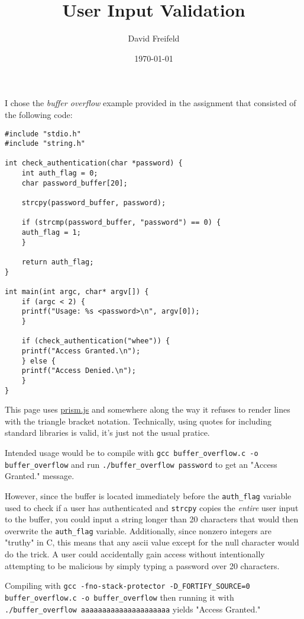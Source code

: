 \documentclass[11pt]{article}
\author{David Freifeld}
\date{\today}
\title{User Input Validation}
\begin{document}
\maketitle
I chose the \emph{buffer overflow} example provided in the assignment that consisted of the following code:

\begin{verbatim}
#include "stdio.h"
#include "string.h"

int check_authentication(char *password) {
    int auth_flag = 0;
    char password_buffer[20];

    strcpy(password_buffer, password);

    if (strcmp(password_buffer, "password") == 0) {
	auth_flag = 1;
    }

    return auth_flag;
}

int main(int argc, char* argv[]) {
    if (argc < 2) {
	printf("Usage: %s <password>\n", argv[0]);
    }

    if (check_authentication("whee")) {
	printf("Access Granted.\n");
    } else {
	printf("Access Denied.\n");
    }
}
\end{verbatim}

\begin{note}
This page uses \href{https://prismjs.com}{prism.js} and somewhere along the way it refuses to render lines with the triangle bracket notation. Technically, using quotes for including standard libraries is valid, it's just not the usual pratice.
\end{note}

Intended usage would be to compile with \texttt{gcc buffer\_overflow.c -o buffer\_overflow} and run \texttt{./buffer\_overflow password} to get an "Access Granted." message.

However, since the buffer is located immediately before the \texttt{auth\_flag} variable used to check if a user has authenticated and \texttt{strcpy} copies the \emph{entire} user input to the buffer, you could input a string longer than 20 characters that would then overwrite the \texttt{auth\_flag} variable. Additionally, since nonzero integers are "truthy" in C, this means that any ascii value except for the null character would do the trick. A user could accidentally gain access without intentionally attempting to be malicious by simply typing a password over 20 characters.

Compiling with \texttt{gcc -fno-stack-protector -D\_FORTIFY\_SOURCE=0 buffer\_overflow.c -o buffer\_overflow}  then running it with \texttt{./buffer\_overflow aaaaaaaaaaaaaaaaaaaaa} yields "Access Granted."
\end{document}
